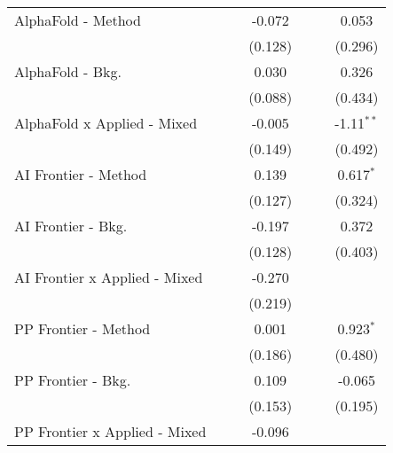 \begin{tabular}{lcccccc}
   AlphaFold - Method             &               &             & -0.072         &               &         & 0.053\\   
                                  &               &             & (0.128)        &               &         & (0.296)\\   
   AlphaFold - Bkg.               &               &             & 0.030          &               &         & 0.326\\   
                                  &               &             & (0.088)        &               &         & (0.434)\\   
   AlphaFold x Applied - Mixed    &               &             & -0.005         &               &         & -1.11$^{**}$\\   
                                  &               &             & (0.149)        &               &         & (0.492)\\   
   AI Frontier - Method           &               &             & 0.139          &               &         & 0.617$^{*}$\\   
                                  &               &             & (0.127)        &               &         & (0.324)\\   
   AI Frontier - Bkg.             &               &             & -0.197         &               &         & 0.372\\   
                                  &               &             & (0.128)        &               &         & (0.403)\\   
   AI Frontier x Applied - Mixed  &               &             & -0.270         &               &         &   \\   
                                  &               &             & (0.219)        &               &         &   \\   
   PP Frontier - Method           &               &             & 0.001          &               &         & 0.923$^{*}$\\   
                                  &               &             & (0.186)        &               &         & (0.480)\\   
   PP Frontier - Bkg.             &               &             & 0.109          &               &         & -0.065\\   
                                  &               &             & (0.153)        &               &         & (0.195)\\   
   PP Frontier x Applied - Mixed  &               &             & -0.096         &               &         &   \\   

\end{tabular}
